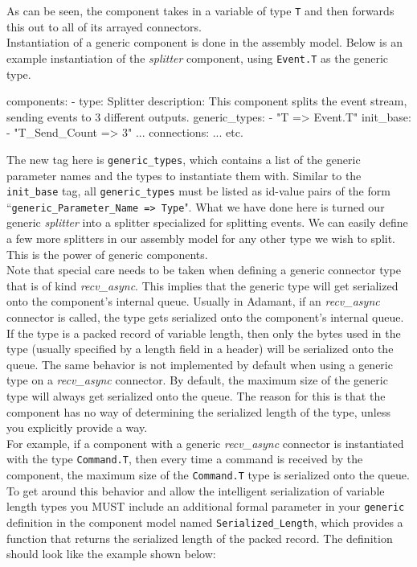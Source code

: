 As can be seen, the component takes in a variable of type \texttt{T} and then forwards this out to all of its arrayed connectors. \\

Instantiation of a generic component is done in the assembly model. Below is an example instantiation of the \textit{splitter} component, using \texttt{Event.T} as the generic type. 

\vspace{5mm} %
\begin{yamlcode}
components:
  - type: Splitter
    description: This component splits the event stream, sending events to 3 different outputs.
    generic_types:
      - "T => Event.T"
    init_base:
      - "T_Send_Count => 3"
  ... 
connections: 
  ...
  etc.
\end{yamlcode}
\vspace{5mm} %

The new tag here is \texttt{generic\_types}, which contains a list of the generic parameter names and the types to instantiate them with.  Similar to the \texttt{init\_base} tag, all \texttt{generic\_types} must be listed as id-value pairs of the form ``\texttt{generic\_Parameter\_Name => Type}". What we have done here is turned our generic \textit{splitter} into a splitter specialized for splitting events. We can easily define a few more splitters in our assembly model for any other type we wish to split. This is the power of generic components. \\

Note that special care needs to be taken when defining a generic connector type that is of kind \textit{recv\_async}. This implies that the generic type will get serialized onto the component's internal queue. Usually in Adamant, if an \textit{recv\_async} connector is called, the type gets serialized onto the component's internal queue. If the type is a packed record of variable length, then only the bytes used in the type (usually specified by a length field in a header) will be serialized onto the queue. The same behavior is not implemented by default when using a generic type on a \textit{recv\_async} connector. By default, the maximum size of the generic type will always get serialized onto the queue. The reason for this is that the component has no way of determining the serialized length of the type, unless you explicitly provide a way. \\

For example, if a component with a generic \textit{recv\_async} connector is instantiated with the type \texttt{Command.T}, then every time a command is received by the component, the maximum size of the \texttt{Command.T} type is serialized onto the queue. To get around this behavior and allow the intelligent serialization of variable length types you MUST include an additional formal parameter in your \texttt{generic} definition in the component model named \texttt{Serialized\_Length}, which provides a function that returns the serialized length of the packed record. The definition should look like the example shown below:

